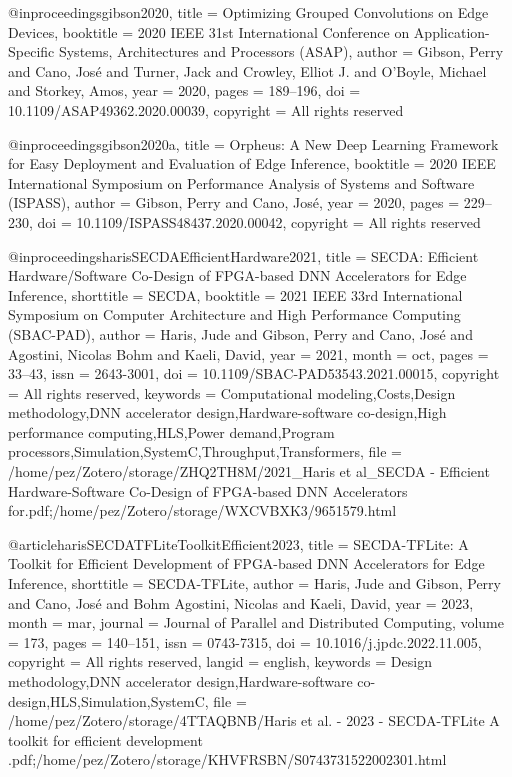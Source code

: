 @inproceedings{gibson2020,
  title = {Optimizing Grouped Convolutions on Edge Devices},
  booktitle = {2020 {{IEEE}} 31st International Conference on Application-Specific Systems, Architectures and Processors ({{ASAP}})},
  author = {Gibson, Perry and Cano, Jos{\'e} and Turner, Jack and Crowley, Elliot J. and O'Boyle, Michael and Storkey, Amos},
  year = {2020},
  pages = {189--196},
  doi = {10.1109/ASAP49362.2020.00039},
  copyright = {All rights reserved}
}

@inproceedings{gibson2020a,
  title = {Orpheus: {{A}} New Deep Learning Framework for Easy Deployment and Evaluation of Edge Inference},
  booktitle = {2020 {{IEEE}} International Symposium on Performance Analysis of Systems and Software ({{ISPASS}})},
  author = {Gibson, Perry and Cano, Jos{\'e}},
  year = {2020},
  pages = {229--230},
  doi = {10.1109/ISPASS48437.2020.00042},
  copyright = {All rights reserved}
}

@inproceedings{harisSECDAEfficientHardware2021,
  title = {{{SECDA}}: {{Efficient Hardware}}/{{Software Co-Design}} of {{FPGA-based DNN Accelerators}} for {{Edge Inference}}},
  shorttitle = {{{SECDA}}},
  booktitle = {2021 {{IEEE}} 33rd {{International Symposium}} on {{Computer Architecture}} and {{High Performance Computing}} ({{SBAC-PAD}})},
  author = {Haris, Jude and Gibson, Perry and Cano, Jos{\'e} and Agostini, Nicolas Bohm and Kaeli, David},
  year = {2021},
  month = oct,
  pages = {33--43},
  issn = {2643-3001},
  doi = {10.1109/SBAC-PAD53543.2021.00015},
  copyright = {All rights reserved},
  keywords = {Computational modeling,Costs,Design methodology,DNN accelerator design,Hardware-software co-design,High performance computing,HLS,Power demand,Program processors,Simulation,SystemC,Throughput,Transformers},
  file = {/home/pez/Zotero/storage/ZHQ2TH8M/2021_Haris et al_SECDA - Efficient Hardware-Software Co-Design of FPGA-based DNN Accelerators for.pdf;/home/pez/Zotero/storage/WXCVBXK3/9651579.html}
}

@article{harisSECDATFLiteToolkitEfficient2023,
  title = {{{SECDA-TFLite}}: {{A}} Toolkit for Efficient Development of {{FPGA-based DNN}} Accelerators for Edge Inference},
  shorttitle = {{{SECDA-TFLite}}},
  author = {Haris, Jude and Gibson, Perry and Cano, Jos{\'e} and Bohm Agostini, Nicolas and Kaeli, David},
  year = {2023},
  month = mar,
  journal = {Journal of Parallel and Distributed Computing},
  volume = {173},
  pages = {140--151},
  issn = {0743-7315},
  doi = {10.1016/j.jpdc.2022.11.005},
  copyright = {All rights reserved},
  langid = {english},
  keywords = {Design methodology,DNN accelerator design,Hardware-software co-design,HLS,Simulation,SystemC},
  file = {/home/pez/Zotero/storage/4TTAQBNB/Haris et al. - 2023 - SECDA-TFLite A toolkit for efficient development .pdf;/home/pez/Zotero/storage/KHVFRSBN/S0743731522002301.html}
}

